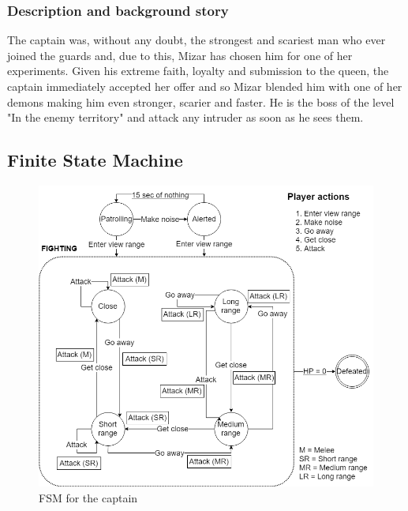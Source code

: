 \subsubsection{Description and background story}
The captain was, without any doubt, the strongest and scariest man who ever joined the guards and, due to this, Mizar has chosen him for one of her experiments. Given his extreme faith, loyalty and submission to the queen, the captain immediately accepted her offer and so Mizar blended him with one of her demons making him even stronger, scarier and faster. He is the boss of the level "In the enemy territory" and attack any intruder as soon as he sees them.

\subsection{Finite State Machine}
\begin{figure}[H]
  \centering
  \includegraphics[width=\textwidth]{Images/Diagrams/FSMs/captainFSM}
  \caption{FSM for the captain}
\end{figure}


